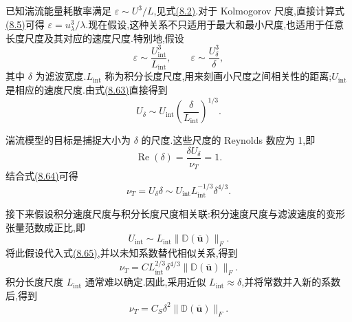 \begin{note}
\label{note:turbulent-viscosity-modeling}
已知湍流能量耗散率满足 $\varepsilon\sim U^3/L$,见式\hyperref[eq:turbulent-energy-dissipation-scaling]{(8.2)}.对于 Kolmogorov 尺度,直接计算式\hyperref[eq:kolmogorov-dissipation-relations]{(8.5)}可得 $\varepsilon=u_\lambda^3/\lambda$.现在假设,这种关系不只适用于最大和最小尺度,也适用于任意长度尺度及其对应的速度尺度.特别地,假设
\begin{equation}\label{eq:smagorinsky-scale-dissipation}
 \varepsilon\sim\frac{U_{\mathrm{int}}^3}{L_{\mathrm{int}}},
 \qquad
 \varepsilon\sim\frac{U_\delta^3}{\delta},
\end{equation}
其中 $\delta$ 为滤波宽度.$L_{\mathrm{int}}$ 称为积分长度尺度,用来刻画小尺度之间相关性的距离;$U_{\mathrm{int}}$ 是相应的速度尺度.由式\hyperref[eq:smagorinsky-scale-dissipation]{(8.63)}直接得到
\begin{equation}\label{eq:smagorinsky-filter-velocity-scale}
 U_\delta\sim
 U_{\mathrm{int}}
 \left(\frac{\delta}{L_{\mathrm{int}}}\right)^{1/3}.
\end{equation}

湍流模型的目标是捕捉大小为 $\delta$ 的尺度.这些尺度的 Reynolds 数应为 1,即
\[
 \operatorname{Re}(\delta)=\frac{\delta U_\delta}{\nu_T}=1.
\]
结合式\hyperref[eq:smagorinsky-filter-velocity-scale]{(8.64)}可得
\begin{equation}\label{eq:smagorinsky-turbulent-viscosity-scale}
 \nu_T
  =U_\delta\delta
  \sim U_{\mathrm{int}}L_{\mathrm{int}}^{-1/3}\delta^{4/3}.
\end{equation}

接下来假设积分速度尺度与积分长度尺度相关联:积分速度尺度与滤波速度的变形张量范数成正比,即
\[
 U_{\mathrm{int}}
  \sim L_{\mathrm{int}}
       \|\mathbb{D}(\overline{\bm{u}})\|_F.
\]
将此假设代入式\hyperref[eq:smagorinsky-turbulent-viscosity-scale]{(8.65)},并以未知系数替代相似关系,得到
\[
 \nu_T
  =C L_{\mathrm{int}}^{2/3}\delta^{4/3}
    \|\mathbb{D}(\overline{\bm{u}})\|_F.
\]
积分长度尺度 $L_{\mathrm{int}}$ 通常难以确定.因此,采用近似 $L_{\mathrm{int}}\approx\delta$,并将常数并入新的系数后,得到
\begin{equation}\label{eq:smagorinsky-turbulent-viscosity}
 \nu_T
  =C_S\delta^2
    \|\mathbb{D}(\overline{\bm{u}})\|_F.
\end{equation}
\end{note}

